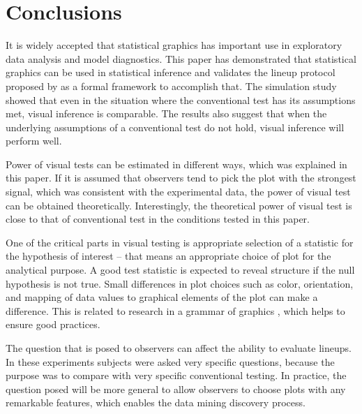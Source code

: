 \documentclass[12pt]{article}
\begin{document}
\section{Conclusions}



It is widely accepted that statistical graphics has important use in exploratory data analysis and model diagnostics. This paper has demonstrated that statistical graphics can be used in statistical inference and validates the lineup protocol proposed by \citet{buja:2009} as a formal framework to accomplish that. The simulation study showed that even in the situation where the conventional test has its assumptions met, visual inference is comparable. The results also suggest that when the underlying assumptions of a conventional test do not hold, visual inference will perform well. 

Power of visual tests can be estimated in different ways, which was explained in this paper. If it is assumed that observers tend to pick the plot with the strongest signal, which was consistent with the experimental data, the power of visual test can be obtained theoretically.  Interestingly, the theoretical power of visual test is close to that of conventional test in the conditions tested in this paper.


One of the critical parts in visual testing is appropriate selection of a statistic for the hypothesis of interest -- that means an appropriate choice of plot for the analytical purpose.  A good test statistic is expected to reveal structure if the null hypothesis is not true. Small differences in plot choices such as color, orientation, and mapping of data values to graphical elements of the plot can make a difference. This is related to research in a grammar of graphics \citep{wilkinson:1999,hadley:2009}, which helps to ensure good practices. %

The question that is posed to observers can affect the ability to evaluate lineups. In these experiments subjects were asked very specific questions, because the purpose was to compare with very specific conventional testing. In practice, the question posed will be more general to allow observers to choose plots with any remarkable features, which enables the data mining discovery process.
\end{document}
